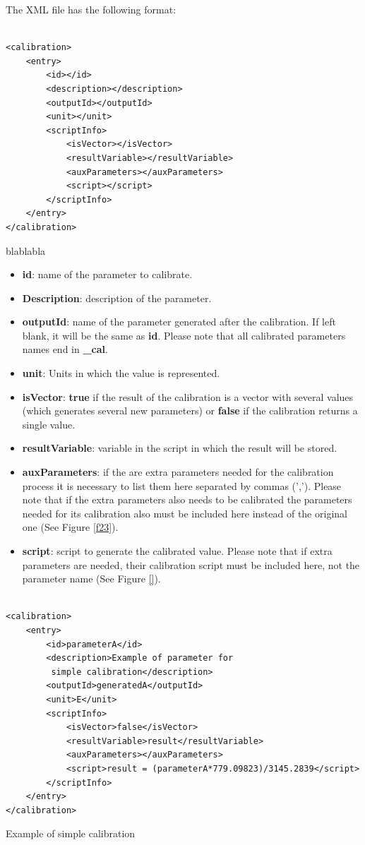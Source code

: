 The XML file has the following format:
\begin{table}[h]
\lstset{language=XML}
\begin{lstlisting}

<calibration>
	<entry>
		<id></id>
		<description></description>
		<outputId></outputId>
		<unit></unit>
		<scriptInfo>
			<isVector></isVector>
			<resultVariable></resultVariable>
			<auxParameters></auxParameters>
			<script></script>
		</scriptInfo>
	</entry>
</calibration>
\end{lstlisting}
\caption{blablabla}
\label{Table5.890}
\end{table}

\begin{itemize}
\item \textbf{id}: name of the parameter to calibrate.
\item \textbf{Description}: description of the parameter.
\item \textbf{outputId}: name of the parameter generated after the calibration. If left blank, it will be the same as \textbf{id}. Please note that all calibrated parameters names end in \textbf{\_cal}.
\item \textbf{unit}: Units in which the value is represented.
\item \textbf{isVector}: \textbf{true} if the result of the calibration is a vector with several values (which generates several new parameters) or \textbf{false} if the calibration returns a single value.
\item \textbf{resultVariable}: variable in the script in which the result will be stored.
\item \textbf{auxParameters}: if the are extra parameters needed for the calibration process it is necessary to list them here separated by commas (','). Please note that if the extra parameters also needs to be calibrated the parameters needed for its calibration also must be included here instead of the original one (See Figure \ref{f23}).
\item \textbf{script}: script to generate the calibrated value. Please note that if extra parameters are needed, their calibration script must be included here, not the parameter name (See Figure \ref{}). 
\end{itemize}



\begin{table}[H]
\lstset{language=XML}
\begin{lstlisting}

<calibration>
	<entry>
		<id>parameterA</id>
		<description>Example of parameter for
		 simple calibration</description>
		<outputId>generatedA</outputId> 
		<unit>E</unit>
		<scriptInfo>
			<isVector>false</isVector>
			<resultVariable>result</resultVariable>
			<auxParameters></auxParameters>
			<script>result = (parameterA*779.09823)/3145.2839</script>
		</scriptInfo>
	</entry>
</calibration>
\end{lstlisting}
\caption{Example of simple calibration}
\label{Table5.x}
\end{table}


